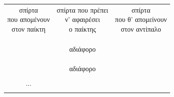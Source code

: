 \documentclass[a4paper,11pt,oneside]{book}
\begin{document}
\begin{center}
\begin{tabular}{ccc}
\parbox[c][0pt][c]{78pt}{\center\small σπίρτα \\που απομένουν\\στον παίκτη} & %
\parbox[c][0pt][c]{78pt}{\center\small σπίρτα που πρέπει\\ν' αφαιρέσει\\ο παίκτης} & %
\parbox[c][0pt][c]{78pt}{\center\small σπίρτα \\που θ' απομείνουν\\στον αντίπαλο} \\\addlinespace[4\parskip]
 &  &  \\\addlinespace[\parskip]
 &  &   \\\addlinespace[\parskip]
 &  &   \\ & αδιάφορο  \\\addlinespace[\parskip]
 &  &   \\\addlinespace[\parskip]
 &  &   \\\addlinespace[\parskip]
 &  &   \\ & αδιάφορο \\\addlinespace[\parskip]
 &  &   \\\addlinespace[\parskip]
... \\\addlinespace[\parskip]
\end{tabular}
\end{center}
\end{document}
